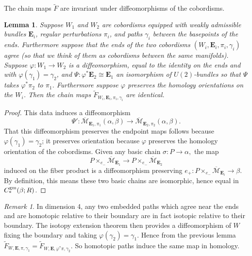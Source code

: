 \documentclass{memo-l}
\newtheorem{lemma}[theorem]{Lemma}
\theoremstyle{definition}
\theoremstyle{remark}
\newtheorem{remark}[theorem]{Remark}
\numberwithin{section}{chapter}
\numberwithin{equation}{chapter}
\begin{document}
The chain maps $\widetilde F$ are invariant under diffeomorphisms of the cobordisms.

\begin{lemma}\label{DiffInvar}Suppose $W_1$ and $W_2$ are cobordisms equipped with weakly admissible bundles $\mathbf{E}_i$, regular perturbations $\pi_i$, and paths $\gamma_i$ between the basepoints of the ends. Furthermore suppose that the ends of the two cobordisms $(W_i, \mathbf{E}_i, \pi_i,\gamma_i)$ agree (so that we think of them as cobordisms between the same manifolds). Suppose $\varphi: W_1 \to W_2$ is a diffeomorphism, equal to the identity on the ends and with $\varphi(\gamma_1) = \gamma_2$, and $\Psi: \varphi^*\mathbf{E}_2 \cong \mathbf{E}_1$ an isomorphism of $U(2)$-bundles so that $\Psi$ takes $\varphi^*\pi_2$ to $\pi_1$. Furthermore suppose $\varphi$ preserves the homology orientations on the $W_i$. Then the chain maps $\widetilde F_{W_i, \mathbf{E}_i, \pi_i, \gamma_i}$ are identical.
\end{lemma}

\begin{proof}This data induces a diffeomorphism $$\Psi': \overline{\mathcal M}_{\mathbf{E}_1,\pi_1}(\alpha, \beta) \to \overline{\mathcal M}_{\mathbf{E}_2,\pi_2}(\alpha,\beta).$$ That this diffeomorphism preserves the endpoint maps follows because $\varphi(\gamma_1) = \gamma_2$; it preserves orientation because $\varphi$ preserves the homology orientation of the cobordisms. Given any basic chain $\sigma: P \to \alpha,$ the map $$P \times_{e_-} \overline{\mathcal M}_{\mathbf{E}_1} \to P \times_{e_-} \overline{\mathcal M}_{\mathbf{E}_2}$$ induced on the fiber product is a diffeomorphism preserving $e_+: P \times_{e_-} \overline{\mathcal M}_{\mathbf{E}_i} \to \beta$. By definition, this means these two basic chains are isomorphic, hence equal in $C_*^{\textup{gm}}(\beta;R)$.
\end{proof}

\begin{remark}In dimension 4, any two embedded paths which agree near the ends and are homotopic relative to their boundary are in fact isotopic relative to their boundary. The isotopy extension theorem then provides a diffeomorphism of $W$ fixing the boundary and taking $\varphi(\gamma_2) = \gamma_1$. Hence from the previous lemma $\widetilde F_{W, \mathbf{E}, \pi, \gamma_1} = \widetilde F_{W, \mathbf{E}, \varphi^*\pi, \gamma_2}$. So homotopic paths induce the same map in homology.
\end{remark}
\end{document}
